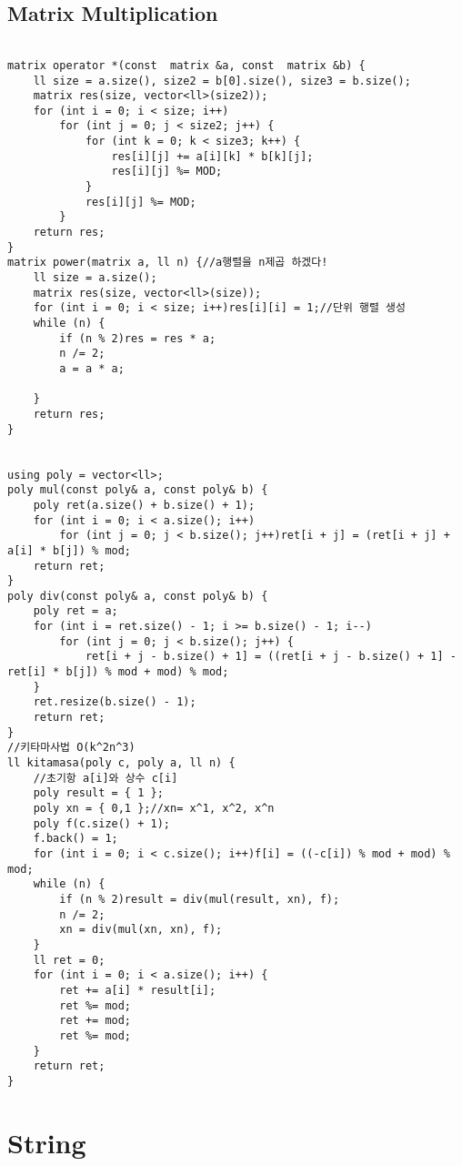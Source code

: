 \documentclass[landscape, 8pt, a4paper, oneside, twocolumn]{extarticle}
\begin{document}
\subsection{Matrix Multiplication}
\begin{verbatim}

matrix operator *(const  matrix &a, const  matrix &b) {
	ll size = a.size(), size2 = b[0].size(), size3 = b.size();
	matrix res(size, vector<ll>(size2));
	for (int i = 0; i < size; i++)
		for (int j = 0; j < size2; j++) {
			for (int k = 0; k < size3; k++) {
				res[i][j] += a[i][k] * b[k][j];
				res[i][j] %= MOD;
			}
			res[i][j] %= MOD;
		}
	return res;
}
matrix power(matrix a, ll n) {//a행렬을 n제곱 하겠다!
	ll size = a.size();
	matrix res(size, vector<ll>(size));
	for (int i = 0; i < size; i++)res[i][i] = 1;//단위 행렬 생성
	while (n) {
		if (n % 2)res = res * a;
		n /= 2;
		a = a * a;

	}
	return res;
}


using poly = vector<ll>;
poly mul(const poly& a, const poly& b) {
	poly ret(a.size() + b.size() + 1);
	for (int i = 0; i < a.size(); i++)
		for (int j = 0; j < b.size(); j++)ret[i + j] = (ret[i + j] + a[i] * b[j]) % mod;
	return ret;
}
poly div(const poly& a, const poly& b) {
	poly ret = a;
	for (int i = ret.size() - 1; i >= b.size() - 1; i--)
		for (int j = 0; j < b.size(); j++) {
			ret[i + j - b.size() + 1] = ((ret[i + j - b.size() + 1] - ret[i] * b[j]) % mod + mod) % mod;
	}
	ret.resize(b.size() - 1);
	return ret;
}
//키타마사법 O(k^2n^3)
ll kitamasa(poly c, poly a, ll n) {
	//초기항 a[i]와 상수 c[i]
	poly result = { 1 };
	poly xn = { 0,1 };//xn= x^1, x^2, x^n
	poly f(c.size() + 1);
	f.back() = 1;
	for (int i = 0; i < c.size(); i++)f[i] = ((-c[i]) % mod + mod) % mod;
	while (n) {
		if (n % 2)result = div(mul(result, xn), f);
		n /= 2;
		xn = div(mul(xn, xn), f);
	}
	ll ret = 0;
	for (int i = 0; i < a.size(); i++) {
		ret += a[i] * result[i];
		ret %= mod;
		ret += mod;
		ret %= mod;
	}
	return ret;
}
\end{verbatim}
\newpage
\section{String}
\end{document}
